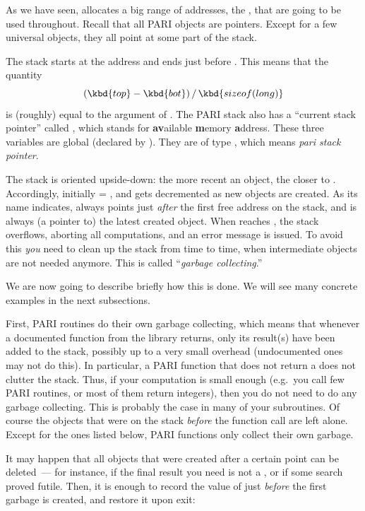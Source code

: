 \noindent
As we have seen,  allocates a big range of
addresses, the , that are going to be used throughout. Recall
that all PARI objects are pointers. Except for a few universal objects,
they all point at some part of the stack.

The stack starts at the address  and ends just before . This
means that the quantity
%
$$ (\kbd{top} - \kbd{bot})\,/\,\kbd{sizeof(long)} $$
%
is (roughly) equal to the  argument of . The PARI
stack also has a ``current stack pointer'' called , which stands
for {\bf av}ailable {\bf m}emory {\bf a}ddress. These three variables are
global (declared by ). They are of type , which
means \emph{pari stack pointer}.

The stack is oriented upside-down: the more recent an object, the closer to
. Accordingly, initially  = , and  gets
decremented as new objects are created. As its name indicates,
 always points just \emph{after} the first free address on the
stack, and  is always (a pointer to) the latest created object.
When  reaches , the stack overflows, aborting all
computations, and an error message is issued. To avoid this \emph{you}
need to clean up the stack from time to time, when intermediate objects are
not needed anymore. This is called ``\emph{garbage collecting}.''

We are now going to describe briefly how this is done. We will see many
concrete examples in the next subsections.

\noindent\item
First, PARI routines do their own garbage collecting, which means that
whenever a documented function from the library returns, only its result(s)
have been added to the stack, possibly up to a very small overhead
(undocumented ones may not do this). In
particular, a PARI function that does not return a  does not clutter
the stack. Thus, if your computation is small enough (e.g.~you call few PARI
routines, or most of them return  integers), then you do not need
to do any garbage collecting. This is probably the case in many of your
subroutines. Of course the objects that were on the stack \emph{before} the
function call are left alone. Except for the ones listed below, PARI
functions only collect their own garbage.

\noindent\item
It may happen that all objects that were created after a certain point can
be deleted~--- for instance, if the final result you need is not a
, or if some search proved futile. Then, it is enough to record
the value of  just \emph{before} the first garbage is created,
and restore it upon exit:


